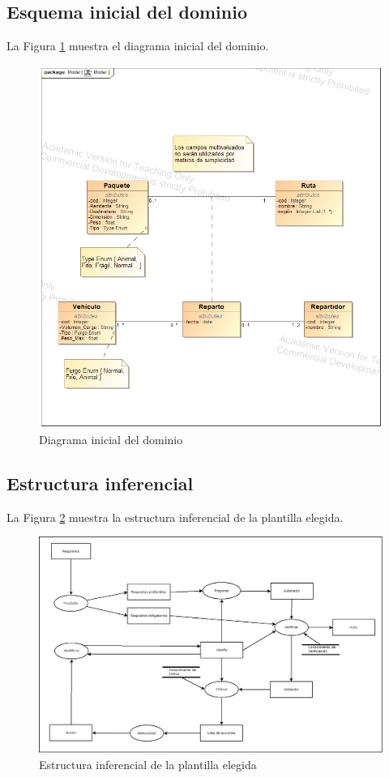 \subsection{Esquema inicial del dominio}
La Figura \ref{fig:DiagramaInicialDominio} muestra el diagrama inicial del dominio.
\begin{figure}[H]
  \centering
  \includegraphics[scale=0.50]{imaxes/DiagramaInicialDominio.png}
  \caption{\label{fig:DiagramaInicialDominio}Diagrama inicial del dominio}
\end{figure}

\subsection{Estructura inferencial}

La Figura \ref{fig:EstructuraInferencial} muestra la estructura inferencial de la plantilla elegida.
\begin{figure}[H]
  \centering
  \includegraphics[scale=0.50]{imaxes/EstructuraInferencial.png}
  \caption{\label{fig:EstructuraInferencial}Estructura inferencial de la plantilla elegida}
\end{figure}